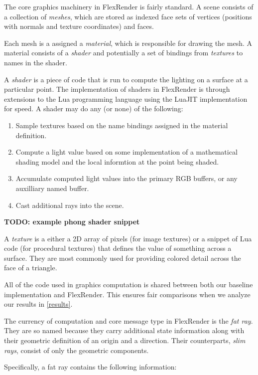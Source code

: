 \documentclass[12pt]{ucthesis}
\begin{document}
The core graphics machinery in FlexRender is fairly standard. A scene consists
of a collection of \emph{meshes}, which are stored as indexed face sets of vertices
(positions with normals and texture coordinates) and faces.

Each mesh is a assigned a \emph{material}, which is responsible for drawing the
mesh. A material consists of a \emph{shader} and potentially a set of bindings
from \emph{textures} to names in the shader.

A \emph{shader} is a piece of code that is run to compute the lighting on a
surface at a particular point. The implementation of shaders in FlexRender is
through extensions to the Lua \cite{lua} programming language using the LuaJIT
\cite{luajit} implementation for speed. A shader may do any (or none) of the
following:

\begin{enumerate}
    \item Sample textures based on the name bindings assigned in the material
        definition.
    \item Compute a light value based on some implementation of a mathematical
        shading model and the local informtion at the point being shaded.
    \item Accumulate computed light values into the primary RGB buffers, or
        any auxilliary named buffer.
    \item Cast additional rays into the scene.
\end{enumerate}

\textbf{TODO: example phong shader snippet}

A \emph{texture} is a either a 2D array of pixels (for image textures) or
a snippet of Lua code (for procedural textures) that defines the value of
something across a surface. They are most commonly used for providing colored
detail across the face of a triangle.

All of the code used in graphics computation is shared between both our baseline
implementation and FlexRender. This ensures fair comparisons when we analyze our
results in \ref{results}.

The currency of computation and core message type in FlexRender is the
\emph{fat ray}. They are so named because they carry additional state
information along with their geometric definition of an origin and a direction.
Their counterparts, \emph{slim rays}, consist of only the geometric components.

Specifically, a fat ray contains the following information:
\end{document}
